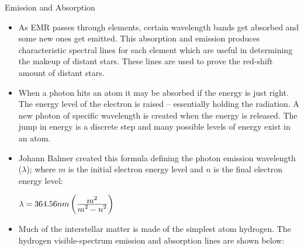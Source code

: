 {\Large Emission and Absorption}
\begin{itemize}


\item As EMR passes through elements, certain wavelength bands get absorbed and some new ones get emitted. This absorption and emission produces characteristic spectral lines for each element which are useful in determining the makeup of distant stars. These lines are used to prove the red-shift amount of distant stars.

\item
 When a photon hits an atom it may be absorbed if the energy is just right.
 The energy level of the electron is raised -- essentially holding the radiation.
 A new photon of specific wavelength is created when the energy is released.
 The jump in energy is a discrete step and many possible levels of energy exist in an atom.

\item Johann Balmer created this formula defining the photon emission wavelength ($\lambda$); where $m$ is the initial electron energy level and $n$ is the final electron energy level:

\hspace{1in}$\lambda = 364.56nm \left( \frac{\displaystyle m^2}{\displaystyle m^2 - n^2} \right)$

\item Much of the interstellar matter is made of the simplest atom hydrogen. The hydrogen visible-spectrum emission and absorption lines are shown below:

\end{itemize}



